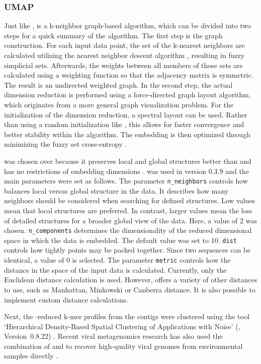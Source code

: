 \documentclass[12pt,a4paper,english]{article}
\begin{document}
	\subsubsection*{UMAP}
	Just like \tsne, \umap is a k-neighbor graph-based algorithm, which can be divided into two steps for a quick summary of the algorithm. The first step is the graph construction.
	For each input data point, the set of the k-nearest neighbors are calculated utilizing the nearest neighbor descent algorithm \citep{k-near:11}, resulting in fuzzy simplicial sets.
	Afterwards, the weights between all members of those sets are calculated using a weighting function so that the adjacency matrix is symmetric. The result is an undirected weighted graph.
	In the second step, the actual dimension reduction is performed using a force-directed graph layout algorithm, which originates from a more general graph visualization problem. For the initialization of the dimension reduction, a spectral layout can be used. Rather than using a random initialization like \tsne, this allows for faster convergence and better stability within the algorithm.
	The embedding is then optimized through minimizing the fuzzy set cross-entropy \citep{umap:18}.
	
	\umap was chosen over \tsne because it preserves local and global structures better than \tsne and has no restrictions of embedding dimensions \citep{umap_better:19, umap:18}.    
	\umap was used in version 0.3.9 and the main parameters were set as follows.
	The parameter \texttt{n\_neighbors} controls how \umap balances local versus global structure in the data. It describes how many neighbors should be considered when searching for defined structures. Low values mean that local structures are preferred. In contrast, larger values mean the loss of detailed structures for a broader global view of the data. Here, a value of 2 was chosen.
	\texttt{n\_components} determines the dimensionality of the reduced dimensional space in which the data is embedded. The default value was set to 10.
	\texttt{dist} controls how tightly points may be packed together. Since two sequences can be identical, a value of 0 is selected.
	The parameter \texttt{metric} controls how the distance in the space of the input data is calculated. Currently, only the Euclidean distance calculation is used. However, \umap offers a variety of other distances to use, such as Manhattan, Minkowski or Canberra distance. It is also possible to implement custom distance calculations.
	
	Next, the \umap-reduced k-mer profiles from the contigs were clustered using the tool `Hierarchical Density-Based Spatial Clustering of Applications with Noise' (\hdbscan, Version~0.8.22) \citep{hdbscan}.
	Recent viral metagenomics research has also used the combination of \umap and \hdbscan to recover high-quality viral genomes from environmental samples directly \citep{umap_hdbscan_usage:19}.
	
\end{document}
